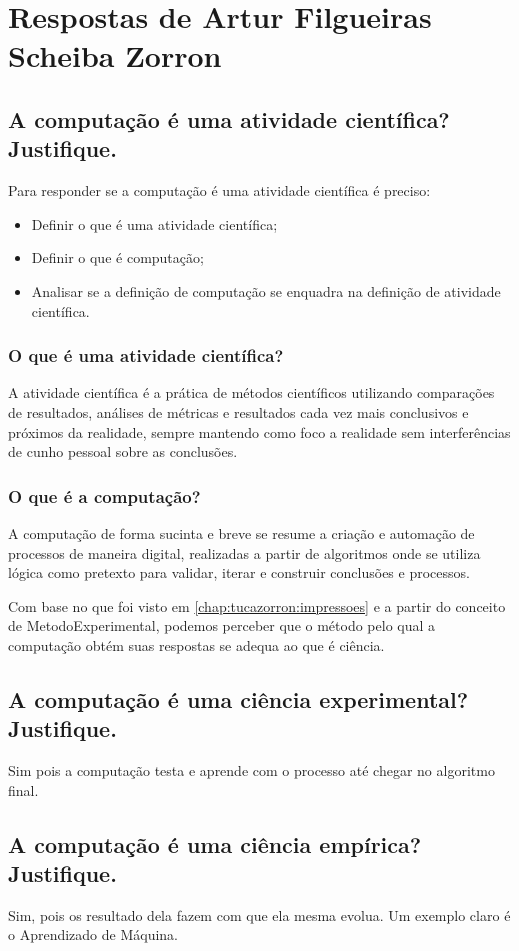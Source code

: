 \section{Respostas de Artur Filgueiras Scheiba Zorron}

\label{tarefa-tucazorron-componentes-experimento}

\subsection{A computação é uma atividade científica? Justifique. }

Para responder se a computação é uma atividade científica é preciso:
\begin{itemize}
    \item Definir o que é uma atividade científica;
    \item Definir o que é computação;
    \item Analisar se a definição de computação se enquadra na definição de atividade científica. 
\end{itemize}

\subsubsection{O que é uma atividade científica?}

A atividade científica é a prática de métodos científicos utilizando comparações de resultados, análises de métricas e resultados cada vez mais conclusivos e próximos da realidade, sempre mantendo como foco a realidade sem interferências de cunho pessoal sobre as conclusões.

\subsubsection{O que é a computação?}

A computação de forma sucinta e breve se resume a criação e automação de processos de maneira digital, realizadas a partir de algoritmos onde se utiliza lógica como pretexto para validar, iterar e construir conclusões e processos.

Com base no que foi visto em \ref{chap:tucazorron:impressoes} e a partir do conceito de \gls{MetodoExperimental}, podemos perceber que o método pelo qual a computação obtém suas respostas se adequa ao que é ciência.

\subsection{A computação é uma ciência experimental? Justifique. }

Sim pois a computação testa e aprende com o processo até chegar no algoritmo final.

\subsection{A computação é uma ciência empírica? Justifique. }

Sim, pois os resultado dela fazem com que ela mesma evolua. Um exemplo claro é o Aprendizado de Máquina.